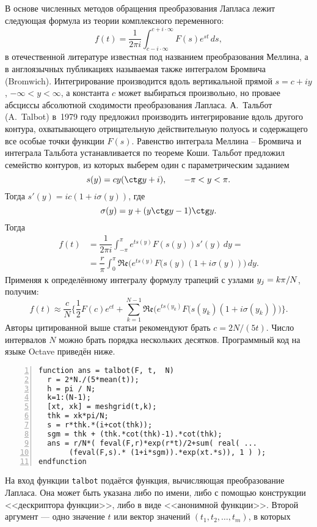 \documentclass[12pt]{extarticle}
\newcommand*{\hm}[1]{#1\nobreak\discretionary{}%
  {\hbox{$\mathsurround=0pt #1$}}{}}
\begin{document}
В основе численных методов обращения преобразования Лапласа лежит следующая
формула из теории комплексного переменного:
\[
f(t) = \dfrac{1}{2\pi i} \int_{c-i\cdot\infty}^{c+i\cdot\infty} F(s) e^{st}\,ds,
\]
в отечественной литературе известная под названием преобразования Меллина, а в
англоязычных публикациях называемая также интегралом Бромвича
(\foreignlanguage{english}{Bromwich}). Интегрирование производится вдоль
вертикальной прямой $s=c+i y$, $-\infty<y<\infty$, а константа $c$ может
выбираться произвольно, но проваее абсциссы абсолютной сходимости преобразования
Лапласа. А.~Тальбот (A.~Talbot) в~1979 году предложил производить интегрирование
вдоль другого контура, охватывающего отрицательную действительную полуось и
содержащего все особые точки функции $F(s)$. Равенство интеграла Меллина --
Бромвича и интеграла Тальбота устанавливается по теореме Коши. Тальбот предложил
семейство контуров, из которых выберем один с параметрическим заданием 
\[
s(y)=cy(\ctg y+i),\qquad -\pi<y<\pi.
\]
Тогда 
\(s'(y)=i c (1+i \sigma(y))\), где 
$$
\sigma(y)=y+(y\ctg y-1)\ctg y.
$$
Тогда
\begin{align*}
  f(t)&=\dfrac{1}{2\pi i} \int_{-\pi}^\pi e^{ts(y)} F(s(y)) s'(y)\, dy=
  \\ &=
  \dfrac{r}{\pi} \int_0^\pi \mathfrak{Re}\bigl(
  e^{ts(y)} F(s(y)(1+i \sigma(y)) \bigr)\,dy.
\end{align*}
Применяя к определённому интегралу формулу трапеций с узлами $y_j\hm=k\pi/N$, получим:
\[
f(t)\approx\dfrac{c}{N}
\biggl\{
\dfrac12 F(c) e^{ct}+
\sum_{k=1}^{N-1} \mathfrak{Re}\bigl(
  e^{ts(y_k)} F(s(y_k)(1+i \sigma(y_k)) \bigr)
\biggr\}.
\]
Авторы цитированной выше статьи рекомендуют брать $c=2N/(5t)$. Число интервалов
$N$ можно брать порядка нескольких десятков. Программный код на языке
\foreignlanguage{english}{Octave} 
приведён ниже.
\begin{Verbatim}[frame=single,xleftmargin=2em,numbers=left]
function ans = talbot(F, t,  N)
  r = 2*N./(5*mean(t));
  h = pi / N;
  k=1:(N-1);
  [xt, xk] = meshgrid(t,k);
  thk = xk*pi/N;
  s = r*thk.*(i+cot(thk));
  sgm = thk + (thk.*cot(thk)-1).*cot(thk);
  ans = r/N*( feval(F,r)*exp(r*t)/2+sum( real( ...
       (feval(F,s).* (1+i*sgm)).*exp(xt.*s)), 1 ) );
endfunction
\end{Verbatim}
На вход функции \texttt{talbot} подаётся функция, вычисляющая преобразование
Лапласа. Она может быть указана либо по имени, либо с помощью конструкции
<<дескриптора функции>>, либо в виде <<анонимной функции>>. Второй аргумент ---
одно значение $t$ или вектор значений $(t_1, t_2, \ldots, t_m)$, в которых
\end{document}
